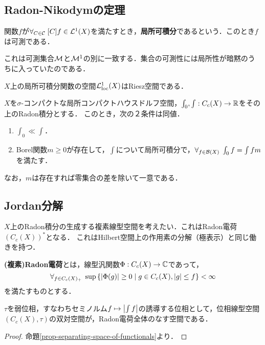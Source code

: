 \documentclass[uplatex,dvipdfmx]{jsreport}
\begin{document}
\subsection{Radon-Nikodymの定理}

\begin{definition}
    関数$f$が$\forall_{C\in\mathcal{C}}\;[C]f\in\mathcal{L}^1(X)$を満たすとき，\textbf{局所可積分}であるという．このとき$f$は可測である．
\end{definition}
\begin{remarks}
    これは可測集合$\mathcal{M}$と$\mathcal{M}^1$の別に一致する．集合の可測性には局所性が暗黙のうちに入っていたのである．
\end{remarks}

\begin{lemma}
    $X$上の局所可積分関数の空間$\mathcal{L}^1_{\mathrm{loc}}(X)$はRiesz空間である．
\end{lemma}

\begin{theorem}
    $X$を$\sigma$-コンパクトな局所コンパクトハウスドルフ空間，$\int_0,\int:C_c(X)\to\mathbb{R}$をその上のRadon積分とする．
    このとき，次の２条件は同値．
    \begin{enumerate}
        \item $\int_0\ll\int$．
        \item Borel関数$m\ge0$が存在して，$\int$について局所可積分で，$\forall_{f\in\mathcal{B}(X)}\;\int_0f=\int fm$を満たす．
    \end{enumerate}
    なお，$m$は存在すれば零集合の差を除いて一意である．
\end{theorem}

\subsection{Jordan分解}

\begin{tcolorbox}[colframe=ForestGreen, colback=ForestGreen!10!white,breakable,colbacktitle=ForestGreen!40!white,coltitle=black,fonttitle=\bfseries\sffamily,
title=]
    $X$上のRadon積分の生成する複素線型空間を考えたい．これはRadon電荷$(C_c(X))^*$となる．
    これはHilbert空間上の作用素の分解（極表示）と同じ働きを持つ．
\end{tcolorbox}

\begin{definition}
    \textbf{(複素)Radon電荷}とは，線型汎関数$\Phi:C_c(X)\to\mathbb{C}$であって，
    \[\forall_{f\in C_c(X)_+}\;\sup\left\{\lvert\Phi(g)\rvert\ge0\mid g\in C_c(X),\lvert g\rvert\le f\right\}<\infty\]
    を満たすものとする．
\end{definition}
\begin{lemma}
    $\tau$を弱位相，すなわちセミノルム$f\mapsto\left|\int f\right|$の誘導する位相として，位相線型空間$(C_c(X),\tau)$の双対空間が，Radon電荷全体のなす空間である．
\end{lemma}
\begin{proof}
    命題\ref{prop-separating-space-of-functionals}より．
\end{proof}
\end{document}
